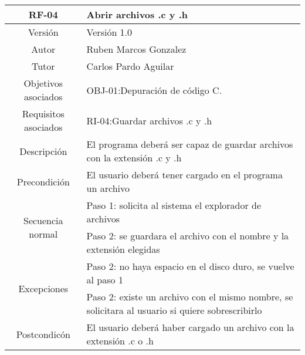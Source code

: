 \begin{table}[h!]
\centering
\begin{tabular}[c]{|c|m{10cm}|}
\hline
RF-04 & Abrir archivos .c y .h \\
\hline
\hline
Versión & Versión 1.0 \\
\hline
Autor & Ruben Marcos Gonzalez \\
\hline
Tutor & Carlos Pardo Aguilar \\
\hline
Objetivos asociados & OBJ-01:Depuración de código C. \\
\hline
Requisitos asociados & RI-04:Guardar archivos .c y .h \\
\hline
Descripción & El programa deberá ser capaz de guardar archivos con la extensión .c y .h \\
\hline
Precondición & El usuario deberá tener cargado en el programa un archivo \\
\hline
\multirow{2}{*}{Secuencia normal} & Paso 1: solicita al sistema el explorador de archivos \\
\hline
& Paso 2: se guardara el archivo con el nombre y la extensión elegidas \\
\hline
\multirow{2}{*}{Excepciones} & Paso 2: no haya espacio en el disco duro, se vuelve al paso 1 \\
\hline
& Paso 2: existe un archivo con el mismo nombre, se solicitara al usuario si quiere sobrescribirlo \\
\hline
Postcondicón & El usuario deberá haber cargado un archivo con la extensión .c o .h \\
\hline
\end{tabular}
\end{table}

